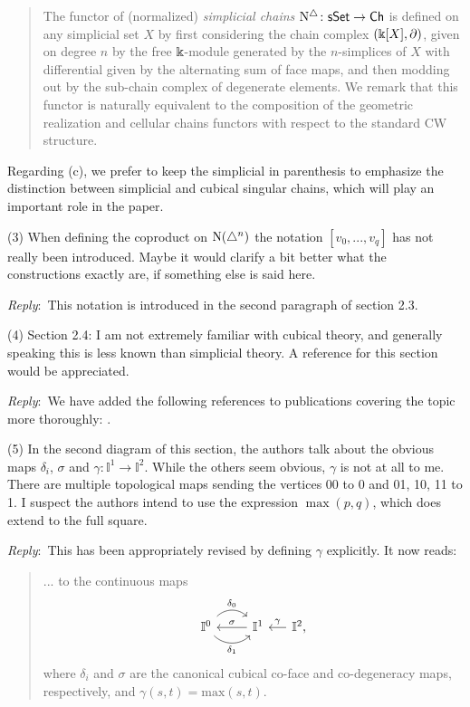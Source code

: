 \documentclass{amsart}
\newcommand{\ar}{\medskip\noindent\textit{Reply}:\ }
\newcommand{\rp}{\medskip\noindent}
\begin{document}
	\begin{quote}
		The functor of (normalized) \textit{simplicial chains} $\operatorname{N^{\triangle}} \colon \mathsf{sSet} \to \mathsf{Ch}$ is defined on any simplicial set $X$ by first considering the chain complex $(\Bbbk[X], \partial)$, given on degree $n$ by the free $\Bbbk$-module generated by the $n$-simplices of $X$ with differential given by the alternating sum of face maps, and then modding out by the sub-chain complex of degenerate elements.
		We remark that this functor is naturally equivalent to the composition of the geometric realization and cellular chains functors with respect to the standard CW structure.
	\end{quote}

	Regarding (c), we prefer to keep the simplicial in parenthesis to emphasize the distinction between simplicial and cubical singular chains, which will play an important role in the paper.

	\rp (3) When defining the coproduct on $\operatorname{N}(\triangle^n)$ the notation $[v_0,...,v_q]$ has not really been introduced.
	Maybe it would clarify a bit better what the constructions exactly are, if something else is said here.

	\ar This notation is introduced in the second paragraph of section 2.3.

	\rp (4) Section 2.4: I am not extremely familiar with cubical theory, and generally	speaking this is less known than simplicial theory.
	A reference for this section would be appreciated.

	\ar We have added the following references to publications covering the topic more thoroughly: \cite{grandis2003cubical,medina2022cube_einfty,medina2023flowing}.

	\rp (5) In the second diagram of this section, the authors talk about the obvious maps $\delta_i$, $\sigma$ and $\gamma \colon \mathbb{I}^1 \to \mathbb{I}^2$.
	While the others seem obvious, $\gamma$ is not at all to me. There are multiple topological maps sending the vertices 00 to 0 and 01, 10, 11 to 1.
	I suspect the authors intend to use the expression $\max(p, q)$, which does extend to the full square.

	\ar This has been appropriately revised by defining $\gamma$ explicitly. It now reads:
    \begin{quote}
     ... to the continuous maps
    \[
    \begin{tikzcd}
    	\gcube^0 \arrow[r, out=45, in=135, "\delta_0"] \arrow[r, out=-45, in=-135, "\delta_1"'] & \gcube^1 \arrow[l, "\sigma"'] &[-10pt] \arrow[l, "\gamma"'] \gcube^2,
    \end{tikzcd}
    \]
    where $\delta_i$ and $\sigma$ are the canonical cubical co-face and co-degeneracy maps, respectively, and $\gamma(s,t)=\text{max}(s,t)$.
    \end{quote}
\end{document}
